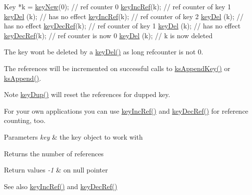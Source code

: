 \begin{DoxyCodeInclude}
Key *k = \hyperlink{group__key_gad23c65b44bf48d773759e1f9a4d43b89}{keyNew}(0); \textcolor{comment}{// ref counter 0}
\hyperlink{group__key_ga6970a6f254d67af7e39f8e469bb162f1}{keyIncRef}(k); \textcolor{comment}{// ref counter of key 1}
\hyperlink{group__key_ga3df95bbc2494e3e6703ece5639be5bb1}{keyDel} (k);   \textcolor{comment}{// has no effect}
\hyperlink{group__key_ga6970a6f254d67af7e39f8e469bb162f1}{keyIncRef}(k); \textcolor{comment}{// ref counter of key 2}
\hyperlink{group__key_ga3df95bbc2494e3e6703ece5639be5bb1}{keyDel} (k);   \textcolor{comment}{// has no effect}
\hyperlink{group__key_ga2c6433ca22109e4e141946057eccb283}{keyDecRef}(k); \textcolor{comment}{// ref counter of key 1}
\hyperlink{group__key_ga3df95bbc2494e3e6703ece5639be5bb1}{keyDel} (k);   \textcolor{comment}{// has no effect}
\hyperlink{group__key_ga2c6433ca22109e4e141946057eccb283}{keyDecRef}(k); \textcolor{comment}{// ref counter is now 0}
\hyperlink{group__key_ga3df95bbc2494e3e6703ece5639be5bb1}{keyDel} (k); \textcolor{comment}{// k is now deleted}
\end{DoxyCodeInclude}
 The key won\textquotesingle{}t be deleted by a \hyperlink{group__key_ga3df95bbc2494e3e6703ece5639be5bb1}{key\+Del()} as long refcounter is not 0.

The references will be incremented on successful calls to \hyperlink{group__keyset_gaa5a1d467a4d71041edce68ea7748ce45}{ks\+Append\+Key()} or \hyperlink{group__keyset_ga21eb9c3a14a604ee3a8bdc779232e7b7}{ks\+Append()}.

\begin{DoxyNote}{Note}
\hyperlink{group__key_gae6ec6a60cc4b8c1463fa08623d056ce3}{key\+Dup()} will reset the references for dupped key.
\end{DoxyNote}
For your own applications you can use \hyperlink{group__key_ga6970a6f254d67af7e39f8e469bb162f1}{key\+Inc\+Ref()} and \hyperlink{group__key_ga2c6433ca22109e4e141946057eccb283}{key\+Dec\+Ref()} for reference counting, too.


\begin{DoxyParams}{Parameters}
{\em key} & the key object to work with \\
\hline
\end{DoxyParams}
\begin{DoxyReturn}{Returns}
the number of references 
\end{DoxyReturn}

\begin{DoxyRetVals}{Return values}
{\em -\/1} & on null pointer \\
\hline
\end{DoxyRetVals}
\begin{DoxySeeAlso}{See also}
\hyperlink{group__key_ga6970a6f254d67af7e39f8e469bb162f1}{key\+Inc\+Ref()} and \hyperlink{group__key_ga2c6433ca22109e4e141946057eccb283}{key\+Dec\+Ref()} 
\end{DoxySeeAlso}
\mbox{\label{group__key_ga6970a6f254d67af7e39f8e469bb162f1}} 
